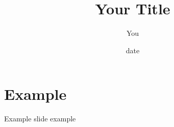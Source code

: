 \documentclass[12pt]{beamer}
\institute{
\begin{tikzpicture}[overlay,remember picture,inner sep=0pt, outer sep=0pt]
    \node[anchor=south,yshift=5pt] at (current page text area.south) {\texttt{[image: example-image]}};
\end{tikzpicture}}
\title{Your Title}
\author{You}
\date{date}
\begin{document}
\begin{frame}
\maketitle
\end{frame}

\section{Example}
\begin{frame}{Example}
slide example
\end{frame}
\end{document}
